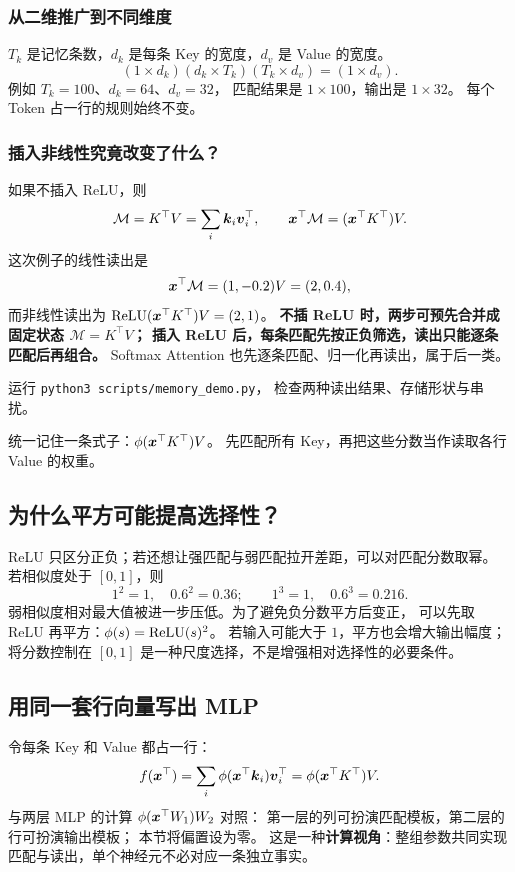 \subsubsection{从二维推广到不同维度}
$T_k$ 是记忆条数，$d_k$ 是每条 Key 的宽度，$d_v$ 是 Value 的宽度。
\[
(1\times d_k)(d_k\times T_k)(T_k\times d_v)=(1\times d_v).
\]
例如 $T_k=100$、$d_k=64$、$d_v=32$，
匹配结果是 $1\times100$，输出是 $1\times32$。
每个 Token 占一行的规则始终不变。

\subsubsection{插入非线性究竟改变了什么？}
如果不插入 ReLU，则
\[
\mathcal{M}=K^\top V=\sum_i \boldsymbol{k}_i \boldsymbol{v}_i^\top,
\qquad \boldsymbol{x}^\top\mathcal{M}=(\boldsymbol{x}^\top K^\top)V.
\]
这次例子的线性读出是
\[
\boldsymbol{x}^\top\mathcal{M}=(1,-0.2)V=(2,0.4),
\]
而非线性读出为 $\operatorname{ReLU}(\boldsymbol{x}^\top K^\top)V=(2,1)$。
\textbf{不插 ReLU 时，两步可预先合并成固定状态 $\mathcal{M}=K^\top V$；
插入 ReLU 后，每条匹配先按正负筛选，读出只能逐条匹配后再组合。}
Softmax Attention 也先逐条匹配、归一化再读出，属于后一类。

运行 \texttt{python3 scripts/memory\_demo.py}，
检查两种读出结果、存储形状与串扰。

\begin{idea}
统一记住一条式子：$\phi(\boldsymbol{x}^\top K^\top)V$。
先匹配所有 Key，再把这些分数当作读取各行 Value 的权重。
\end{idea}

\subsection{为什么平方可能提高选择性？}
ReLU 只区分正负；若还想让强匹配与弱匹配拉开差距，可以对匹配分数取幂。
若相似度处于 $[0,1]$，则
\[
1^2=1,\quad0.6^2=0.36;\qquad
1^3=1,\quad0.6^3=0.216.
\]
弱相似度相对最大值被进一步压低。为了避免负分数平方后变正，
可以先取 ReLU 再平方：$\phi(s)=\operatorname{ReLU}(s)^2$。
若输入可能大于 $1$，平方也会增大输出幅度；将分数控制在 $[0,1]$ 是一种尺度选择，不是增强相对选择性的必要条件。

\subsection{用同一套行向量写出 MLP}
令每条 Key 和 Value 都占一行：
\[
f(\boldsymbol{x}^\top)=\sum_i\phi(\boldsymbol{x}^\top\boldsymbol{k}_i)\boldsymbol{v}_i^\top
=\phi(\boldsymbol{x}^\top K^\top)V.
\]
与两层 MLP 的计算
$\phi(\boldsymbol{x}^\top W_1)W_2$ 对照：
第一层的列可扮演匹配模板，第二层的行可扮演输出模板；
本节将偏置设为零。
这是一种\textbf{计算视角}：整组参数共同实现匹配与读出，单个神经元不必对应一条独立事实。

